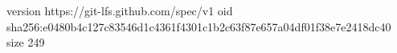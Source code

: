 version https://git-lfs.github.com/spec/v1
oid sha256:e0480b4c127c83546d1c4361f4301c1b2c63f87e657a04df01f38e7e2418dc40
size 249
